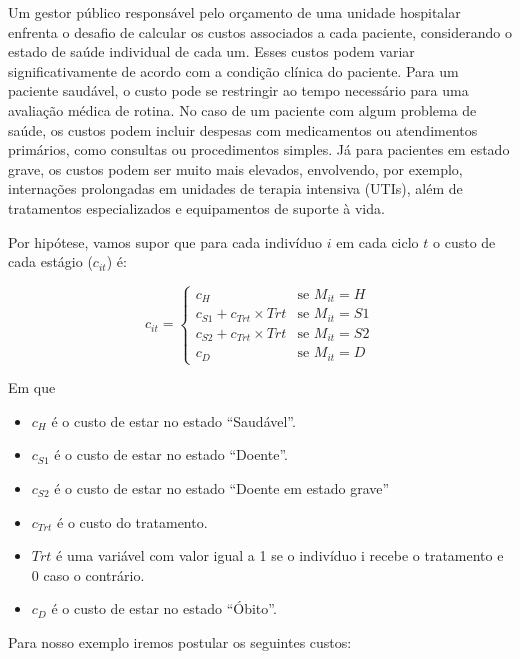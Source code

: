 \documentclass[12pt, a4paper, openany]{book}
\numberwithin{equation}{chapter}
\numberwithin{table}{chapter}
\numberwithin{figure}{chapter}
\theoremstyle{break}
\begin{document}
Um gestor público responsável pelo orçamento de uma unidade hospitalar enfrenta o desafio de calcular os custos associados a cada paciente, considerando o estado de saúde individual de cada um. Esses custos podem variar significativamente de acordo com a condição clínica do paciente. Para um paciente saudável, o custo pode se restringir ao tempo necessário para uma avaliação médica de rotina. No caso de um paciente com algum problema de saúde, os custos podem incluir despesas com medicamentos ou atendimentos primários, como consultas ou procedimentos simples. Já para pacientes em estado grave, os custos podem ser muito mais elevados, envolvendo, por exemplo, internações prolongadas em unidades de terapia intensiva (UTIs), além de tratamentos especializados e equipamentos de suporte à vida.



Por hipótese, vamos supor que para cada indivíduo \( i \) em cada ciclo \( t \) o custo de cada estágio ($c_{it}$) é:

    \[
    c_{it} =
    \begin{cases} 
      c_H & \text{se } M_{it} = H \\
      c_{S1} + c_{Trt} \times Trt & \text{se } M_{it} = S1 \\
      c_{S2} + c_{Trt} \times Trt & \text{se } M_{it} = S2 \\
      c_D & \text{se } M_{it} = D 
    \end{cases}
    \]

Em que 

\begin{itemize}
    \item $c_H$ é o custo de estar no estado ``Saudável''.  
    \item $c_{S1}$ é o custo de estar no estado ``Doente''. 

    \item $c_{S2}$ é o custo de estar no estado ``Doente em estado grave''

    \item $c_{Trt}$ é o custo do tratamento.

    \item  $Trt$ é uma variável com valor igual a 1 se o indivíduo i recebe o tratamento e 0 caso o contrário.

    \item $c_{D}$ é o custo de estar no estado ``Óbito''. 
\end{itemize}


Para nosso exemplo iremos postular os seguintes custos:
\end{document}
